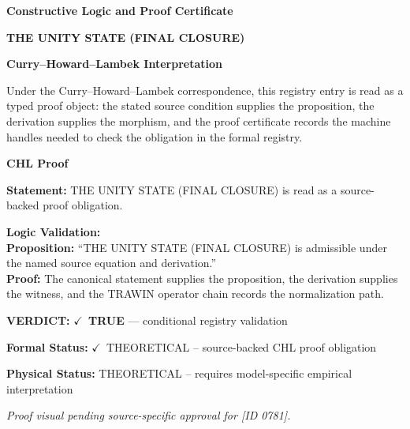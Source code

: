 \clearpage
\begingroup\tzpsupportsetup
\noindent\textbf{\fontsize{10.8pt}{12.8pt}\selectfont [ID 0781] Constructive Logic and Proof Certificate}\par
\noindent\textbf{\fontsize{10pt}{12pt}\selectfont THE UNITY STATE (FINAL CLOSURE)}\par
\vspace{0.45em}
\begingroup
\footnotesize
\setlength{\parskip}{0.22em}
\setlength{\parindent}{0pt}
\noindent\textbf{Curry--Howard--Lambek Interpretation}\par
Under the Curry--Howard--Lambek correspondence, this registry entry is read as a typed proof
object: the stated source condition supplies the proposition, the derivation supplies the
morphism, and the proof certificate records the machine handles needed to check the obligation
in the formal registry.

\vspace{0.45em}
\noindent\textbf{CHL Proof}\par
\textbf{Statement:} THE UNITY STATE (FINAL CLOSURE) is read as a source-backed proof obligation.

\textbf{Logic Validation:}\\
\textbf{Proposition:} ``THE UNITY STATE (FINAL CLOSURE) is admissible under the named source equation and derivation.''\\
\textbf{Proof:} The canonical statement supplies the proposition, the derivation supplies the witness, and the TRAWIN operator chain records the normalization path.

\textbf{VERDICT:} \ensuremath{\checkmark}\ \textbf{TRUE} --- conditional registry validation

\textbf{Formal Status:} \ensuremath{\checkmark}\ THEORETICAL -- source-backed CHL proof obligation

\textbf{Physical Status:} THEORETICAL -- requires model-specific empirical interpretation
\par\vspace{0.45em}
\par
\vfill
\begingroup\footnotesize\itshape
Proof visual pending source-specific approval for [ID 0781].
\par\endgroup
\vfill
\endgroup
\endgroup

